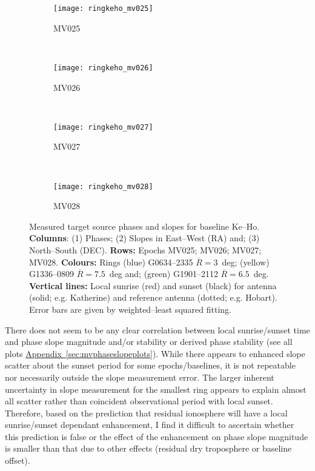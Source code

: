 		\begin{figure}[H]
			\centering
			\begin{subfigure}[t]{0.9\textwidth}
				\centering
				\texttt{[image: ringkeho\_mv025]}
				\caption[Ke-Ho MV025]{MV025}
			\end{subfigure}
			~
			\begin{subfigure}[t]{0.9\textwidth}
				\centering
				\texttt{[image: ringkeho\_mv026]}
				\caption[Ke-Ho MV026]{MV026}
			\end{subfigure}
			~
			\begin{subfigure}[t]{0.9\textwidth}
				\centering
				\texttt{[image: ringkeho\_mv027]}
				\caption[Ke-Ho MV027]{MV027}
			\end{subfigure}
			~			
			\begin{subfigure}[t]{0.9\textwidth}
				\centering
				\texttt{[image: ringkeho\_mv028]}
				\caption[Ke-Ho MV028]{MV028}
			\end{subfigure}
			\caption[MV026 Slopes]{Measured target source phases and slopes for baseline Ke--Ho. \textbf{Columns}: (1) Phases; (2) Slopes in East--West (RA) and; (3) North--South (DEC). \textbf{Rows:} Epochs MV025; MV026; MV027; MV028. \textbf{Colours:} Rings (blue) G0634--2335 $\overline{R}=3$~deg; (yellow) G1336--0809 $\overline{R}=7.5$~deg and; (green) G1901--2112 $\overline{R}=6.5$~deg. \textbf{Vertical lines:} Local sunrise (red) and sunset (black) for antenna (solid; e.g. Katherine) and reference antenna (dotted; e.g. Hobart). Error bars are given by weighted--least squared fitting.} \label{fig:mv026_ps}
		\end{figure}
		
		There does not seem to be any clear correlation between local sunrise/sunset time and phase slope magnitude and/or stability or derived phase stability (see all plots \hyperref[sec:mvphaseslopeplots]{Appendix~\ref*{sec:mvphaseslopeplots}}). While there appears to enhanced slope scatter about the sunset period for some epochs/baselines, it is not repeatable nor necessarily outside the slope measurement error. The larger inherent uncertainty in slope measurement for the smallest ring appears to explain almost all scatter rather than coincident observational period with local sunset. Therefore, based on the prediction that residual ionosphere will have a local sunrise/sunset dependant enhancement, I find it difficult to ascertain whether this prediction is false or the effect of the enhancement on phase slope magnitude is smaller than that due to other effects (residual dry troposphere or baseline offset).
		
